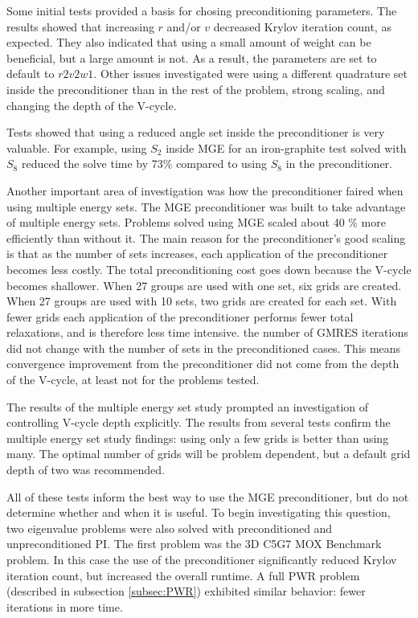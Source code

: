 \documentclass[preprint,12pt]{elsarticle}
\begin{document}
Some initial tests provided a basis for chosing preconditioning parameters. The results showed that increasing $r$ and/or $v$ decreased Krylov iteration count, as expected. They also indicated that using a small amount of weight can be beneficial, but a large amount is not. As a result, the parameters are set to default to $r2v2w1$. Other issues investigated were using a different quadrature set inside the preconditioner than in the rest of the problem, strong scaling, and changing the depth of the V-cycle. 

Tests showed that using a reduced angle set inside the preconditioner is very valuable. For example, using $S_2$ inside MGE for an iron-graphite test solved with $S_8$ reduced the solve time by 73\% compared to using $S_8$ in the preconditioner.

Another important area of investigation was how the preconditioner faired when using multiple energy sets. The MGE preconditioner was built to take advantage of multiple energy sets. Problems solved using MGE scaled about 40 \% more efficiently than without it. The main reason for the preconditioner’s good scaling is that as the number of sets increases, each application of the preconditioner becomes less costly. The total preconditioning cost goes down because the V-cycle becomes shallower. When 27 groups are used with one set, six grids are created. When 27 groups are used with 10 sets, two grids are created for each set. With fewer grids each application of the preconditioner performs fewer total relaxations, and is therefore less time intensive. the number of GMRES iterations did not change with the number of sets in the preconditioned cases. This means convergence improvement from the preconditioner did not come from the depth of the V-cycle, at least not for the problems tested.

The results of the multiple energy set study prompted an investigation of controlling V-cycle depth explicitly. The results from several tests confirm the multiple energy set study findings: using only a few grids is better than using many. The optimal number of grids will be problem dependent, but a default grid depth of two was recommended.

All of these tests inform the best way to use the MGE preconditioner, but do not determine whether and when it is useful. To begin investigating this question, two eigenvalue problems were also solved with preconditioned and unpreconditioned PI. The first problem was the 3D C5G7 MOX Benchmark problem. In this case the use of the preconditioner significantly reduced Krylov iteration count, but increased the overall runtime. A full PWR problem (described in subsection \ref{subsec:PWR}) exhibited similar behavior: fewer iterations in more time. 
\end{document}
